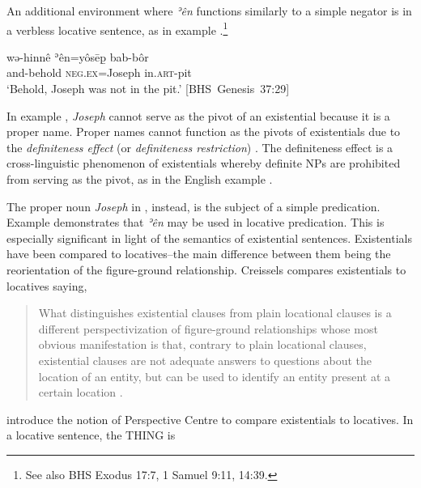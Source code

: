 ﻿\documentclass[output=paper]{langsci/langscibook}
\begin{document}
An additional environment where \textit{ʾên} functions similarly to a
simple negator is in a verbless locative sentence, as in example
.\footnote{See also BHS Exodus 17:7, 1 Samuel 9:11, 14:39.}
%
\begin{exe}\ex \label{ex:heb-Joseph}
    \gll  wə-hinnê ʾên=yôsēp̱ bab-bôr\\
and-behold \textsc{neg.ex}=Joseph in.\textsc{art}-pit \\
    \glt `Behold, Joseph was not in the pit.'
    \mbox{[BHS Genesis 37:29]} \end{exe}
%
In example , \textit{Joseph} cannot serve as the pivot of an
existential because it is a proper name. Proper names cannot function as
the pivots of existentials due to the \textit{definiteness effect}
(or \textit{definiteness restriction}) \parencites[195]{Milsark1974}%
{Leonetti2008}. The definiteness effect is a cross-linguistic
phenomenon of existentials whereby definite NPs are prohibited from serving
as the pivot, as in the English example .
%
\begin{exe}\label{ex:heb-eng-dog}  \end{exe}
% 
The proper noun \textit{Joseph} in , instead, is the
subject of a simple predication. Example  demonstrates
that \textit{ʾên} may be used in locative predication. This is especially
significant in light of the semantics of existential sentences.
Existentials have been compared to locatives–the main difference between
them being the reorientation of the figure-ground relationship. Creissels
compares existentials to locatives saying,
%
\begin{quote}
  What distinguishes existential clauses from plain locational   clauses is
  a different perspectivization of figure-ground   relationships whose most
  obvious manifestation is that, contrary   to plain locational clauses,
  existential clauses are not adequate   answers to questions about the
  location of an entity, but can be   used to identify an entity present at
  a certain location \citep[2]{Creissels2014}. 
\end{quote}
%
\textcite{ParteeBorschev2002} introduce the notion of Perspective Centre
to compare existentials to locatives. In a locative sentence, the THING is
\end{document}
